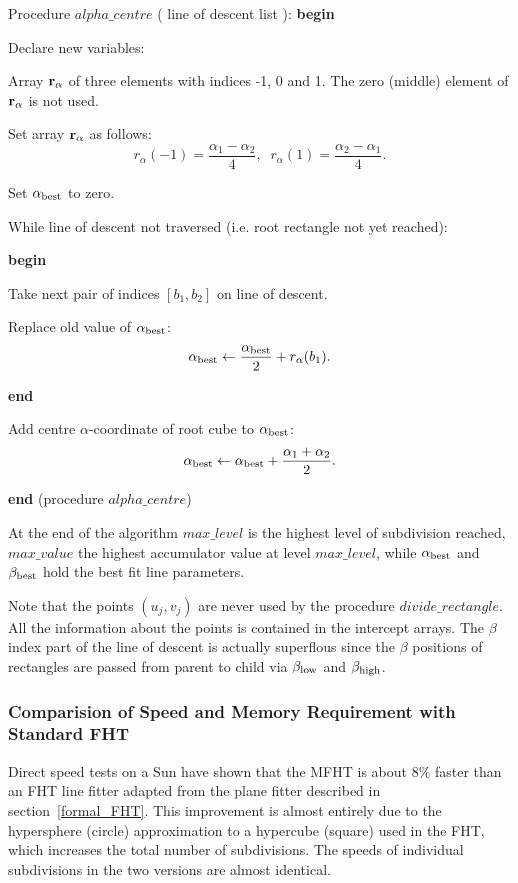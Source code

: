   Procedure $alpha\_centre$ ( line of descent list ):
  {\bf begin}
  \begin{indent_para}
   Declare new variables:
   \begin{indent_para}
    Array ${\bf r}_{\alpha}$ of three elements with indices -1, 0 and 1.
    The zero (middle) element of ${\bf r}_{\alpha}$ is not used.
   \end{indent_para}
   Set array ${\bf r}_{\alpha}$ as follows:
   \[ r_{\alpha}(-1) = \frac{\alpha_1 - \alpha_2}{4},\;\;
      r_{\alpha}(1) = \frac{\alpha_2 - \alpha_1}{4}. \]

   Set $\alpha_{\rm best}$ to zero.

   While line of descent not traversed (i.e. root rectangle not yet reached):

   {\bf begin}
   \begin{indent_para}
    Take next pair of indices $[b_1,b_2]$ on line of descent.

    Replace old value of $\alpha_{\rm best}$:
    \[ \alpha_{\rm best} \leftarrow \frac{\alpha_{\rm best}}{2} +
       r_{\alpha}(b_1). \]
   \end{indent_para}
   {\bf end}

   Add centre $\alpha$-coordinate of root cube to $\alpha_{\rm best}$:
   \[ \alpha_{\rm best} \leftarrow \alpha_{\rm best} +
	\frac{\alpha_1 + \alpha_2}{2}. \]
  \end{indent_para}
  {\bf end} (procedure $alpha\_centre$)

  At the end of the algorithm $max\_level$ is the highest level of subdivision
  reached, $max\_value$ the highest accumulator value at level $max\_level$,
  while $\alpha_{\rm best}$ and $\beta_{\rm best}$ hold the best fit line
  parameters.

  Note that the points $(u_j,v_j)$ are never used by the procedure
  $divide\_rectangle$. All the information about the points is contained in
  the intercept arrays. The $\beta$ index part of the line of descent is
  actually superflous since the $\beta$ positions of rectangles are passed
  from parent to child via $\beta_{\rm low}$ and $\beta_{\rm high}$.
 \subsubsection{Comparision of Speed and Memory Requirement with Standard FHT}
  Direct speed tests on a Sun have shown that
  the MFHT is about 8\% faster than an FHT line fitter adapted from
  the plane fitter described in section~\ref{formal_FHT}. This improvement
  is almost entirely due to the hypersphere (circle) approximation to
  a hypercube (square) used in the FHT, which increases the total number of
  subdivisions. The speeds of individual subdivisions in the two versions
  are almost identical.

